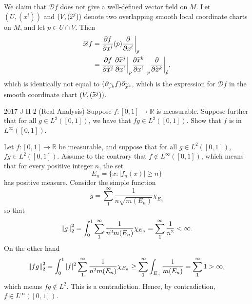 \documentclass{article}
\begin{document}
\begin{solutions}
	We claim that $\mathscr{D}f$ does not give a well-defined vector field on $M$. Let $(U, (x^{i}))$ and $(V, (\widetilde{x}^{i}))$ denote two overlapping smooth local coordinate charts on $M$, and let $p \in U \cap V$. Then 
		\begin{align}
			\begin{split}
				\mathscr{D}f &= \frac{\partial f}{\partial x^{i}}(p)\frac{\partial}{\partial x^{i}}\bigg|_{p} \\
				&= \frac{\partial f}{\partial \widetilde{x}^{j}}\frac{\partial \widetilde{x}^{j}}{\partial x^{i}}\bigg|_{p}\frac{\partial \widetilde{x}^{k}}{\partial x^{i}}\bigg|_{p}\frac{\partial}{\partial \widetilde{x}^{k}}\bigg|_{\hat{p}}, 
			\end{split}
		\end{align}
	which is identically not equal to $(\partial_{\widetilde{x^{k}}}f)\partial_{\widetilde{x}^{k}}$, which is the expression for $\mathscr{D}f$ in the smooth coordinate chart $(V, (\widetilde{x}^{j}))$.  
\end{solutions}
\begin{prb}{2017-J-II-2 (Real Analysis)}
	Suppose $f: [0,1] \to \mathbb{R}$ is measurable. Suppose further that for all $g \in L^{2}([0,1])$, we have that $fg \in L^{2}([0,1])$. Show that $f$ is in $L^{\infty}([0,1])$. 
\end{prb}
\begin{solutions}
	Let $f: [0,1] \to \mathbb{R}$ be measurable, and suppose that for all $g \in L^{2}([0,1])$, $fg \in L^{2}([0,1])$. Assume to the contrary that $f \notin L^{\infty}([0,1])$, which means that for every positive integer $n$, the set 
		\begin{equation}
			E_{n} = \{x: |f_{n}(x)| \geq n\}
		\end{equation}
	has positive measure. Consider the simple function 
		\begin{equation}
			g = \sum_{1}^{\infty}\frac{1}{n\sqrt{m(E_{n})}}\chi_{E_{n}}
		\end{equation}
	so that 
		\begin{equation}
			\left\Vert g \right\Vert_{2}^{2} = \int_{0}^{1} \sum_{1}^{\infty}\frac{1}{n^{2}m(E_{n})}\chi_{E_{n}} = \sum_{1}^{\infty}\frac{1}{n^{2}} < \infty. 
		\end{equation}
	On the other hand 
		\begin{eqnarray}
			\left\Vert fg \right\Vert_{2}^{2} = \int_{0}^{1}|f|^{2}\sum_{1}^{\infty}\frac{1}{n^{2}m(E_{n})}\chi_{E_{n}} \geq \sum_{1}^{\infty}\int_{E_{n}}\frac{1}{m(E_{n})} = \sum_{1}^{\infty}1 >\infty, 
		\end{eqnarray}
	which means $fg \notin L^{2}$. This is a contradiction. Hence, by contradiction, $f \in L^{\infty}([0,1])$. 
\end{solutions}
\end{document}
